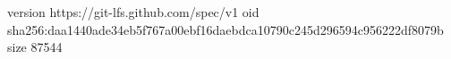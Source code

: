 version https://git-lfs.github.com/spec/v1
oid sha256:daa1440ade34eb5f767a00ebf16daebdca10790c245d296594c956222df8079b
size 87544
